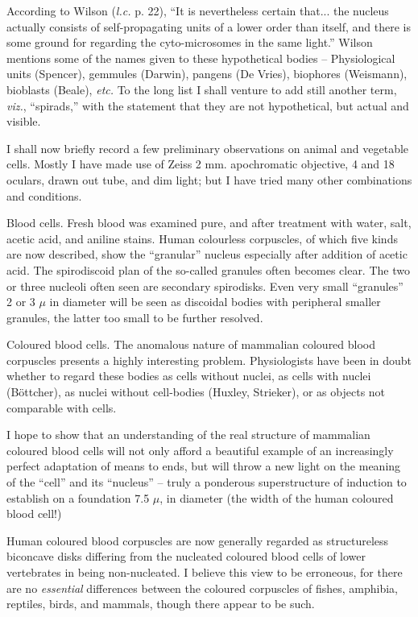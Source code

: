 \documentclass[a4paper, 12pt, oneside]{article}
\begin{document}
According to Wilson (\emph{l.c.} p. 22), ``It is nevertheless certain that... the nucleus actually consists of self-propagating units of a lower order than itself, and there is some ground for regarding the cyto-microsomes in the same light.'' Wilson mentions some of the names given to these hypothetical bodies -- Physiological units (Spencer), gemmules (Darwin), pangens (De Vries), biophores (Weismann), bioblasts (Beale), \emph{etc.} To the long list I shall venture to add still another term, \emph{viz.}, ``spirads,'' with the statement that they are not hypothetical, but actual and visible.

I shall now briefly record a few preliminary observations on animal and vegetable cells. Mostly I have made use of Zeiss 2 mm. apochromatic objective, 4 and 18 oculars, drawn out tube, and dim light; but I have tried many other combinations and conditions.

Blood cells. Fresh blood was examined pure, and after treatment with water, salt, acetic acid, and aniline stains. Human colourless corpuscles, of which five kinds are now described, show the ``granular'' nucleus especially after addition of acetic acid. The spirodiscoid plan of the so-called granules often becomes clear. The two or three nucleoli often seen are secondary spirodisks. Even very small ``granules'' 2 or 3 $\mu$ in diameter will be seen as discoidal bodies with peripheral smaller granules, the latter too small to be further resolved.

Coloured blood cells. The anomalous nature of mammalian coloured blood corpuscles presents a highly interesting problem. Physiologists have been in doubt whether to regard these bodies as cells without nuclei, as cells with nuclei (Böttcher), as nuclei without cell-bodies (Huxley, Strieker), or as objects not comparable with cells.

I hope to show that an understanding of the real structure of mammalian coloured blood cells will not only afford a beautiful example of an increasingly perfect adaptation of means to ends, but will throw a new light on the meaning of the ``cell'' and its ``nucleus'' -- truly a ponderous superstructure of induction to establish on a foundation 7.5 $\mu$, in diameter (the width of the human coloured blood cell!)

Human coloured blood corpuscles are now generally regarded as structureless biconcave disks differing from the nucleated coloured blood cells of lower vertebrates in being non-nucleated. I believe this view to be erroneous, for there are no \emph{essential} differences between the coloured corpuscles of fishes, amphibia, reptiles, birds, and mammals, though there appear to be such.
\end{document}
